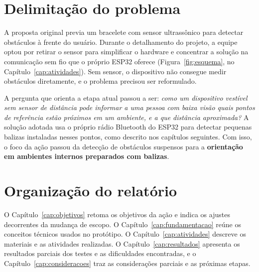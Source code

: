 \section{Delimitação do problema}
\label{sec:delimitacao}

A proposta original previa um bracelete com sensor ultrassônico para detectar obstáculos à frente do usuário. Durante o detalhamento do projeto, a equipe optou por retirar o sensor para simplificar o hardware e concentrar a solução na comunicação sem fio que o próprio ESP32 oferece (Figura~\ref{fig:esquema}, no Capítulo~\ref{cap:atividades}). Sem sensor, o dispositivo não consegue medir obstáculos diretamente, e o problema precisou ser reformulado.

A pergunta que orienta a etapa atual passou a ser: \textit{como um dispositivo vestível sem sensor de distância pode informar a uma pessoa com baixa visão quais pontos de referência estão próximos em um ambiente, e a que distância aproximada?} A solução adotada usa o próprio rádio Bluetooth do ESP32 para detectar pequenas balizas instaladas nesses pontos, como descrito nos capítulos seguintes. Com isso, o foco da ação passou da detecção de obstáculos suspensos para a \textbf{orientação em ambientes internos preparados com balizas}.

\section{Organização do relatório}
\label{sec:organizacao}

O Capítulo~\ref{cap:objetivos} retoma os objetivos da ação e indica os ajustes decorrentes da mudança de escopo. O Capítulo~\ref{cap:fundamentacao} reúne os conceitos técnicos usados no protótipo. O Capítulo~\ref{cap:atividades} descreve os materiais e as atividades realizadas. O Capítulo~\ref{cap:resultados} apresenta os resultados parciais dos testes e as dificuldades encontradas, e o Capítulo~\ref{cap:consideracoes} traz as considerações parciais e as próximas etapas.
